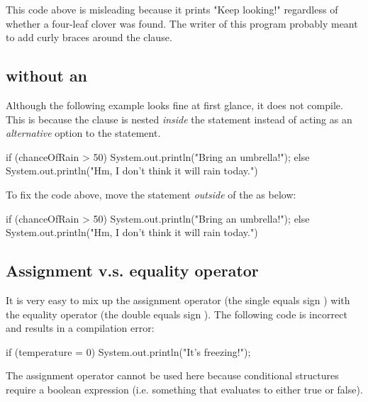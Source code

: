 This code above is misleading because it prints "Keep looking!" regardless of whether a four-leaf clover was found. The writer of this program probably meant to add curly braces around the  clause.

\subsection{ without an }

Although the following example looks fine at first glance, it does not compile. This is because the  clause is nested \emph{inside} the  statement instead of acting as an \emph{alternative} option to the  statement.

\begin{code}
if (chanceOfRain > 50) {
    System.out.println("Bring an umbrella!");
    else {
        System.out.println("Hm, I don't think it will rain today.")
    }
}
\end{code}

To fix the code above, move the  statement \emph{outside} of the  as below:

\begin{code}
if (chanceOfRain > 50) {
    System.out.println("Bring an umbrella!");
} else {
    System.out.println("Hm, I don't think it will rain today.")
}
\end{code}

\subsection{Assignment v.s. equality operator}
It is very easy to mix up the assignment operator (the single equals sign \ic{=}) with the equality operator (the double equals sign \ic{==}). The following code is incorrect and results in a compilation error:

\begin{code}
if (temperature = 0) {
    System.out.println("It's freezing!");
}
\end{code}

The assignment operator cannot be used here because conditional structures require a boolean expression (i.e. something that evaluates to either true or false). 


